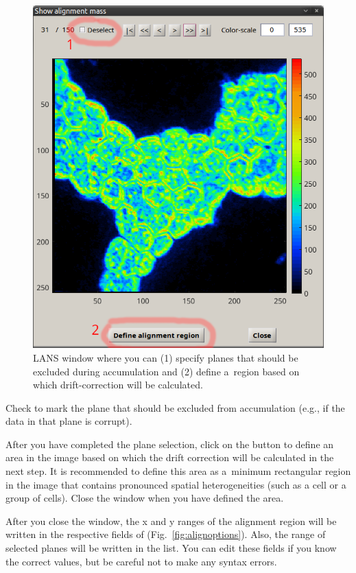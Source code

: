 \begin{figure}[!ht]
\centering
\includegraphics[scale=0.4]{figs3/LANS-show-alignment-mass}
\caption{\label{fig:show-alignment-mass}%
LANS window where you can (1) specify planes that should be excluded during accumulation and (2) define a~region based on which drift-correction will be calculated.}
\end{figure}

\bul Check  to mark the plane that should be excluded from accumulation (e.g., if the data in that plane is corrupt).

\bul After you have completed the plane selection, click on the  button to define an area in the image based on which the drift correction will be calculated in the next step. It is recommended to define this area as a~minimum rectangular region in the image that contains pronounced spatial heterogeneities (such as a cell or a group of cells). Close the window when you have defined the area.

\bul After you close the window, the x and y ranges of the alignment region will be written in the respective fields of  (Fig.~\ref{fig:alignoptions}). Also, the range of selected planes will be written in the  list. You can edit these fields if you know the correct values, but be careful not to make any syntax errors. 

